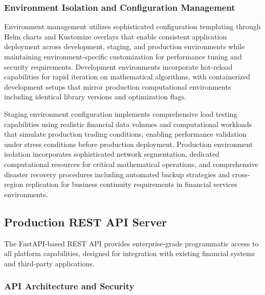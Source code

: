\documentclass[12pt,a4paper]{article}
\theoremstyle{definition}
\theoremstyle{remark}
\begin{document}
\subsubsection{Environment Isolation and Configuration Management}

Environment management utilizes sophisticated configuration templating through Helm charts and Kustomize overlays that enable consistent application deployment across development, staging, and production environments while maintaining environment-specific customization for performance tuning and security requirements. Development environments incorporate hot-reload capabilities for rapid iteration on mathematical algorithms, with containerized development setups that mirror production computational environments including identical library versions and optimization flags.

Staging environment configuration implements comprehensive load testing capabilities using realistic financial data volumes and computational workloads that simulate production trading conditions, enabling performance validation under stress conditions before production deployment. Production environment isolation incorporates sophisticated network segmentation, dedicated computational resources for critical mathematical operations, and comprehensive disaster recovery procedures including automated backup strategies and cross-region replication for business continuity requirements in financial services environments.

\subsection{Production REST API Server}

The FastAPI-based REST API provides enterprise-grade programmatic access to all platform capabilities, designed for integration with existing financial systems and third-party applications.

\subsubsection{API Architecture and Security}
\end{document}
